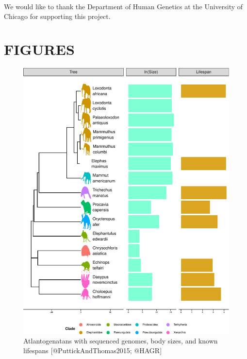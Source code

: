 \documentclass[]{elsarticle} %
\begin{document}
We would like to thank the Department of Human Genetics at the University of Chicago for supporting this project.

\hypertarget{figures}{%
\section{FIGURES}\label{figures}}

\begin{figure}

\includegraphics[width=6in]{paper_PLOS_draft_files/figure-latex/Figure-intro-1} \hfill{}

\caption{Atlantogenatans with sequenced genomes, body sizes, and known lifespans [@PuttickAndThomas2015; @HAGR]}\label{fig:Figure-intro}
\end{figure}
\end{document}
